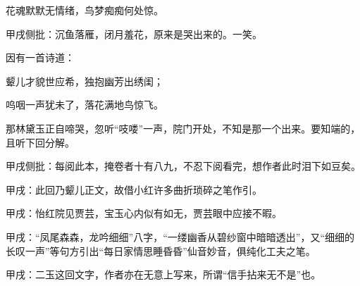 \begin{poem}

    \begin{pl}花魂默默无情绪，鸟梦痴痴何处惊。\end{pl}\begin{note}甲戌侧批：沉鱼落雁，闭月羞花，原来是哭出来的。一笑。\end{note}
\end{poem}
\begin{parag}
    因有一首诗道：
\end{parag}
\begin{poem}
    \begin{pl}颦儿才貌世应希，独抱幽芳出绣闺；\end{pl}
    \begin{pl}呜咽一声犹未了，落花满地鸟惊飞。\end{pl}
\end{poem}
\begin{parag}
    那林黛玉正自啼哭，忽听“吱喽”一声，院门开处，不知是那一个出来。要知端的，且听下回分解。\begin{note}甲戌侧批：每阅此本，掩卷者十有八九，不忍下阅看完，想作者此时泪下如豆矣。\end{note}
\end{parag}


\begin{parag}
    \begin{note}甲戌：此回乃颦儿正文，故借小红许多曲折琐碎之笔作引。\end{note}
\end{parag}


\begin{parag}
    \begin{note}甲戌：怡红院见贾芸，宝玉心内似有如无，贾芸眼中应接不暇。\end{note}
\end{parag}


\begin{parag}
    \begin{note}甲戌：“凤尾森森，龙吟细细”八字，“一缕幽香从碧纱窗中暗暗透出”，又“细细的长叹一声”等句方引出“每日家情思睡昏昏”仙音妙音，俱纯化工夫之笔。\end{note}
\end{parag}


\begin{parag}
    \begin{note}甲戌：二玉这回文字，作者亦在无意上写来，所谓“信手拈来无不是”也。\end{note}
\end{parag}


